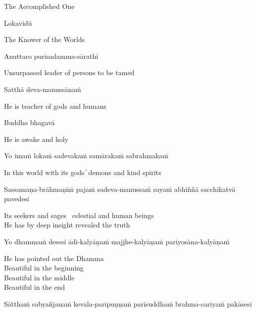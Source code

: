 \begin{english}
  The Accomplished One
\end{english}

Lokavidū

\begin{english}
  The Knower of the Worlds
\end{english}

Anuttaro purisadamma-sārathi

\begin{english}
  Unsurpassed leader of persons to be tamed
\end{english}

Satthā deva-manussānaṁ

\begin{english}
  He is teacher of gods and humans
\end{english}

Buddho bhagavā

\begin{english}
  He is awake and holy
\end{english}

Yo imaṁ lokaṁ sadevakaṁ samārakaṁ sabrahmakaṁ

\begin{english}
  In this world with its gods ̓ demons and kind spirits
\end{english}

Sassamaṇa-brāhmaṇiṁ pajaṁ sadeva-manussaṁ sayaṁ abhiññā sacchikatvā pavedesi

\begin{english}
  Its seekers and sages \breathmark\ celestial and human beings\\
  He has by deep insight revealed the truth
\end{english}

Yo dhammaṁ desesi ādi-kalyāṇaṁ majjhe-kalyāṇaṁ pariyosāna-kalyāṇaṁ

\begin{english}
  He has pointed out the Dhamma\\
  Beautiful in the beginning\\
  Beautiful in the middle\\
  Beautiful in the end\\
\end{english}

Sātthaṁ sabyañjanaṁ kevala-paripuṇṇaṁ parisuddhaṁ brahma-cariyaṁ pakāsesi

